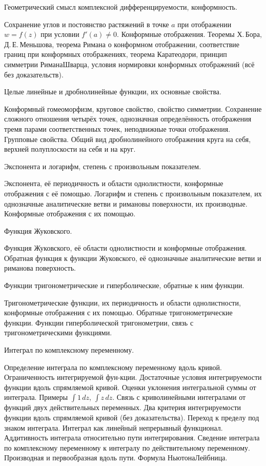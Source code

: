 \documentclass[a4paper]{article}
\begin{document}
\begin{nums}{-2}
\item Геометрический смысл комплексной дифференцируемости, конформность.

Сохранение углов и постоянство
растяжений в точке $a$ при отображении $w = f(z)$ при условии $f'(a) \neq 0$. Конформные отображения. Теоремы
Х.\,Бора, Д.\,Е.\,Меньшова, теорема Римана о конформном отображении, соответствие границ при конформных
отображениях, теорема Каратеодори, принцип симметрии Римана\ч Шварца, условия нормировки конформных
отображений (всё без доказательств).

\item Целые линейные и дробно\д линейные функции, их основные свойства.

Конформный гомеоморфизм, круговое
свойство, свойство симметрии. Сохранение сложного отношения четырёх точек, однозначная определённость
отображения тремя парами соответственных точек, неподвижные точки отображения. Групповые свойства. Общий вид
дробно\д линейного отображения круга на себя, верхней полуплоскости на себя и на круг.

\item Экспонента и логарифм, степень с произвольным показателем.

Экспонента, её периодичность и области
однолистности, конформные отображения с её помощью. Логарифм и степень с произвольным показателем, их
однозначные аналитические ветви и римановы поверхности, их производные. Конформные отображения с их помощью.

\item Функция Жуковского.

Функция Жуковского, её области однолистности и конформные отображения. Обратная
функция к функции Жуковского, её однозначные аналитические ветви и риманова поверхность.

\item Функции тригонометрические и гиперболические, обратные к ним функции.

Тригонометрические функции, их
периодичность и области однолистности, конформные отображения с их помощью. Обратные тригонометрические
функции. Функции гиперболической тригонометрии, связь с тригонометрическими функциями.

\item Интеграл по комплексному переменному.

Определение интеграла по комплексному переменному вдоль кривой. Ограниченность интегрируемой
фун-\break кции. Достаточные условия интегрируемости функции вдоль спрямляемой кривой. Оценки
уклонения интегральной суммы от интеграла. Примеры $\int 1\,dz$, $\int z\,dz$. Связь с
криволинейными интегралами от функций двух действительных переменных. Два критерия интегрируемости
функции вдоль спрямляемой кривой (без доказательства). Переход к пределу под знаком интеграла.
Интеграл как линейный непрерывный функционал. Аддитивность интеграла относительно пути
интегрирования. Сведение интеграла по комплексному переменному к интегралу по действительному
переменному. Производная и первообразная вдоль пути. Формула Ньютона\ч Лейбница.


\end{nums}
\end{document}
